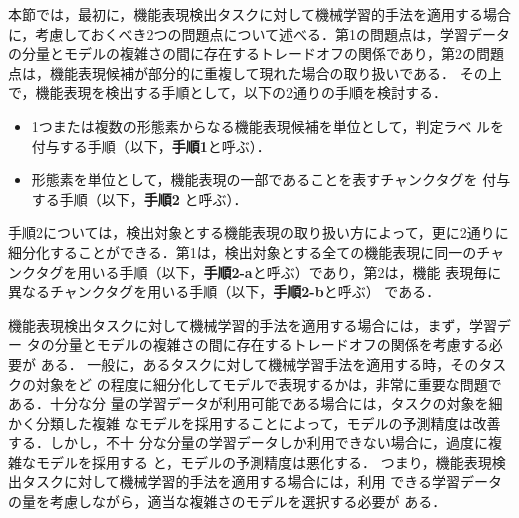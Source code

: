 \documentclass[japanese]{jnlp_1.2d}
\begin{document}
\vspace*{-2pt}
本節では，最初に，機能表現検出タスクに対して機械学習的手法を適用する場合
に，考慮しておくべき2つの問題点について述べる．第1の問題点は，学習データ
の分量とモデルの複雑さの間に存在するトレードオフの関係であり，第2の問題
点は，機能表現候補が部分的に重複して現れた場合の取り扱いである．
その上で，機能表現を検出する手順として，以下の2通りの手順を検討する．
\begin{itemize}
  \item 1つまたは複数の形態素からなる機能表現候補を単位として，判定ラベ
	ルを付与する手順（以下，{\bfseries 手順1}と呼ぶ）．
  \item 形態素を単位として，機能表現の一部であることを表すチャンクタグを
        付与する手順（以下，{\bfseries 手順2} と呼ぶ）．
\end{itemize}
手順2については，検出対象とする機能表現の取り扱い方によって，更に2通りに
細分化することができる．第1は，検出対象とする全ての機能表現に同一のチャ
ンクタグを用いる手順（以下，{\bfseries 手順2-a}と呼ぶ）であり，第2は，機能
表現毎に異なるチャンクタグを用いる手順（以下，{\bfseries 手順2-b}と呼ぶ）
である．

機能表現検出タスクに対して機械学習的手法を適用する場合には，まず，学習デー
タの分量とモデルの複雑さの間に存在するトレードオフの関係を考慮する必要が
ある．
一般に，あるタスクに対して機械学習手法を適用する時，そのタスクの対象をど
の程度に細分化してモデルで表現するかは，非常に重要な問題である．十分な分
量の学習データが利用可能である場合には，タスクの対象を細かく分類した複雑
なモデルを採用することによって，モデルの予測精度は改善する．しかし，不十
分な分量の学習データしか利用できない場合に，過度に複雑なモデルを採用する
と，モデルの予測精度は悪化する．
つまり，機能表現検出タスクに対して機械学習的手法を適用する場合には，利用
できる学習データの量を考慮しながら，適当な複雑さのモデルを選択する必要が
ある．
\end{document}
